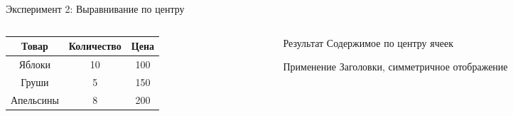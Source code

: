 \documentclass[aspectratio=169]{beamer}
\begin{document}
\begin{frame}{Эксперимент 2: Выравнивание по центру}
    \begin{columns}[T]
        \begin{column}{0.6\textwidth}
            \begin{center}
            \begin{tabular}{|c|c|c|}
            \hline
            \textbf{Товар} & \textbf{Количество} & \textbf{Цена} \\
            \hline
            Яблоки & 10 & 100 \\
            Груши & 5 & 150 \\
            Апельсины & 8 & 200 \\
            \hline
            \end{tabular}
            \end{center}
        \end{column}
        
        \begin{column}{0.4\textwidth}
            \begin{block}{Результат}
                Содержимое по центру ячеек
            \end{block}
            
            \begin{alertblock}{Применение}
                Заголовки, симметричное отображение
            \end{alertblock}
        \end{column}
    \end{columns}
\end{frame}
\end{document}

